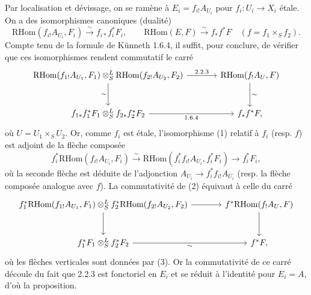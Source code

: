 \documentclass[11pt]{article}
\providecommand{\RHom}{\mathrm{RHom}}
\providecommand{\RHom}{\mathrm{RHom}}
\providecommand{\RHom}{\mathrm R\mathcal{H}om}
\begin{document}
Par localisation et dévissage, on se ramène à $E_i=f_{i!}A_{U_i}$ pour $f_i:U_i\to X_i$ étale. On a des isomorphismes canoniques (dualité)
\begin{equation}\tag{1}
\RHom(f_{i!}A_{U_i},F_i)\xrightarrow{\sim}f_{i*}f_i^{*}F_i,
\qquad
\RHom(E,F)\xrightarrow{\sim}f_{*}f^{*}F\quad(f=f_1\times_S f_2).
\end{equation}
Compte tenu de la formule de Künneth 1.6.4, il suffit, pour conclure, de vérifier que ces isomorphismes rendent commutatif le carré
\[
\begin{tikzcd}[column sep=large,row sep=large]
\RHom(f_{1!}A_{U_1},F_1)\otimes^{L}_{S}\RHom(f_{2!}A_{U_2},F_2) \arrow[r,"2.2.3"] \arrow[d,"\sim"'] & \RHom(f_{!}A_U,F) \arrow[d,"\sim"]\\
f_{1*}f_1^{*}F_1\otimes^{L}_{S}f_{2*}f_2^{*}F_2 \arrow[r,"1.6.4"'] & f_{*}f^{*}F,
\end{tikzcd}
\]
où $U=U_1\times_S U_2$. Or, comme $f_i$ est étale, l'isomorphisme (1) relatif à $f_i$ (resp. $f$) est adjoint de la flèche composée
\begin{equation}\tag{3}
f_i^{*}\RHom(f_{i!}A_{U_i},F_i)\xrightarrow{\sim}\RHom(f_i^{*}f_{i!}A_{U_i},f_i^{*}F_i)\longrightarrow f_i^{*}F_i,
\end{equation}
où la seconde flèche est déduite de l'adjonction $A_{U_i}\to f_i^{*}f_{i!}A_{U_i}$ (resp. la flèche composée analogue avec $f$). La commutativité de (2) équivaut à celle du carré
\[
\begin{tikzcd}[column sep=large,row sep=large]
f_1^{*}\RHom(f_{1!}A_{U_1},F_1)\otimes^{L}_{S}f_2^{*}\RHom(f_{2!}A_{U_2},F_2) \arrow[r] \arrow[d] & f^{*}\RHom(f_{!}A_U,F) \arrow[d]\\
f_1^{*}F_1\otimes^{L}_{S}f_2^{*}F_2 \arrow[r,"\sim"'] & f^{*}F,
\end{tikzcd}
\]
où les flèches verticales sont données par (3). Or la commutativité de ce carré découle du fait que 2.2.3 est fonctoriel en $E_i$ et se réduit à l'identité pour $E_i=A$, d'où la proposition.
\end{document}
